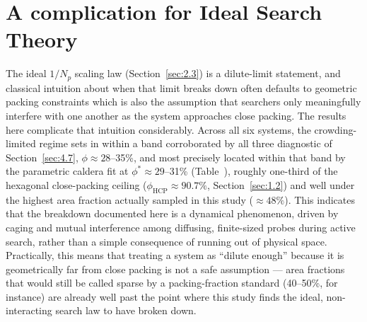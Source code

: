\section{A complication for Ideal Search Theory}
\label{sec:4.9}
The ideal $1/N_p$ scaling law (Section~\ref{sec:2.3}) is a dilute-limit statement, and classical intuition about when that limit breaks down often defaults to geometric packing constraints which is also the assumption that searchers only meaningfully interfere with one another as the system approaches close packing. The results here complicate that intuition considerably. Across all six systems, the crowding-limited regime sets in within a band corroborated by all three diagnostic of Section~\ref{sec:4.7}, $\phi \approx28$--35\%, and most precisely located within that band by the parametric caldera fit at $\phi^* \approx 29$--31\% (Table~\label{ref:4.1}), roughly one-third of the hexagonal close-packing ceiling ($\phi_\text{HCP} \approx 90.7\%$, Section~\ref{sec:1.2}) and well under the highest area fraction actually sampled in this study ($\approx 48\%$). This indicates that the breakdown documented here is a dynamical phenomenon, driven by caging and mutual interference among diffusing, finite-sized probes during active search, rather than a simple consequence of running out of physical space. Practically, this means that treating a system as ``dilute enough'' because it is geometrically far from close packing is not a safe assumption --- area fractions that would still be called sparse by a packing-fraction standard (40--50\%, for instance) are already well past the point where this study finds the ideal, non-interacting search law to have broken down.

